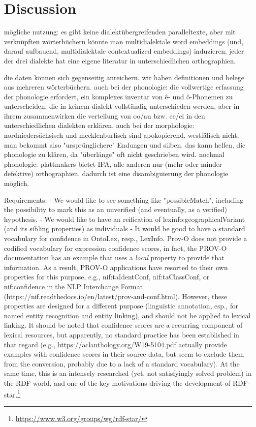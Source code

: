 \documentclass{article}
\begin{document}
\section{Discussion}

mögliche nutzung: es gibt keine dialektübergreifenden paralleltexte, aber mit verknüpften wörterbüchern könnte man multidialektale word embeddings (und, darauf aufbauend, multidialektale contextualized embeddings) induzieren. jeder der drei dialekte hat eine eigene literatur in unterschiedlichen orthographien.

die daten können sich gegenseitig anreichern. wir haben definitionen und belege aus mehreren wörterbüchern. auch bei der phonologie: die vollwertige erfassung der phonologie erfordert, ein komplexes inventar von ê- und ô-Phonemen zu unterscheiden, die in keinem dialekt vollständig unterschieden werden, aber in ihrem zusammenwirken die verteilung von oo/au bzw. ee/ei in den unterschiedlichen dialekten erklären. auch bei der morphologie: nordniedersächsisch und mecklenburfisch sind apokopierend, westfälisch nicht, man bekommt also "ursprünglichere" Endungen und silben. das kann helfen, die phonologie zu klären, da "überlänge" oft nicht geschrieben wird. nochmal phonologie: plattmakers bietet IPA, alle anderen nur (mehr oder minder defektive) orthographien. dadurch ist eine disambiguierung der phonologie möglich.


Requirements:
- We would like to see something like "possibleMatch", including the possibility to mark this as an unverified (and eventually, as a verified) hypothesis.
- We would like to have an reification of lexinfo:geographicalVariant (and its sibling properties) as individuals
- It would be good to have a standard vocabulary for confidence in OntoLex, resp., LexInfo. Prov-O does not provide a codified vocabulary for expression confidence scores, in fact, the PROV-O documentation has an example that uses a \emph{local} property to provide that information. As a result, PROV-O applications have resorted to their own properties for this purpose, e.g., nif:taIdentConf, nif:taClassConf, or nif:confidence in the NLP Interchange Format (https://nif.readthedocs.io/en/latest/prov-and-conf.html). However, these properties are designed for a different purpose (linguistic annotation, esp., for named entity recognition and entity linking), and should not be applied to lexical linking. It should be noted that confidence scores are a recurring component of lexical resources, but apparently, no standard practice has been established in that regard (e.g., https://aclanthology.org/W19-5104.pdf actually provide examples with confidence scores in their source data, but seem to exclude them from the conversion, probably due to a lack of a standard vocabulary). At the same time, this is an intensely researched (yet, not satisfyingly solved problem) in the RDF world, and one of the key motivations driving the development of RDF-star.\footnote{\url{https://www.w3.org/groups/wg/rdf-star/}}
\end{document}
